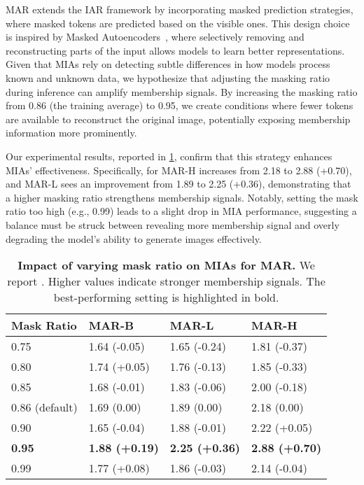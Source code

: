 MAR extends the IAR framework by incorporating masked prediction strategies, where masked tokens are predicted based on the visible ones. This design choice is inspired by Masked Autoencoders~\citep{he2022masked}, where selectively removing and reconstructing parts of the input allows models to learn better representations. Given that MIAs rely on detecting subtle differences in how models process known and unknown data, we hypothesize that adjusting the masking ratio during inference can amplify membership signals. By increasing the masking ratio from 0.86 (the training average) to 0.95, we create conditions where fewer tokens are available to reconstruct the original image, potentially exposing membership information more prominently.  

Our experimental results, reported in \cref{tab:adjusting_mask}, confirm that this strategy enhances MIAs' effectiveness. Specifically, \tprat for MAR-H increases from 2.18 to 2.88 (+0.70), and MAR-L sees an improvement from 1.89 to 2.25 (+0.36), demonstrating that a higher masking ratio strengthens membership signals. Notably, setting the mask ratio too high (e.g., 0.99) leads to a slight drop in  MIA performance, suggesting a balance must be struck between revealing more membership signal and overly degrading the model’s ability to generate images effectively.

\begin{table}[h!]
    \centering
    \scriptsize
    \caption{\textbf{Impact of varying mask ratio on MIAs for MAR.} We report \tprat. Higher values indicate stronger membership signals. The best-performing setting is highlighted in bold.}
    \label{tab:adjusting_mask}
    \begin{tabular}{llll}
\toprule
Mask Ratio & MAR-B & MAR-L & MAR-H \\
\midrule
0.75 & 1.64 (-0.05) & 1.65 (-0.24) & 1.81 (-0.37) \\
0.80 & 1.74 (+0.05) & 1.76 (-0.13) & 1.85 (-0.33) \\
0.85 & 1.68 (-0.01) & 1.83 (-0.06) & 2.00 (-0.18) \\
0.86  (default) & 1.69 (0.00) & 1.89 (0.00) & 2.18 (0.00) \\
0.90 & 1.65 (-0.04) & 1.88 (-0.01) & 2.22 (+0.05) \\
\textbf{0.95} & \textbf{1.88 (+0.19)} & \textbf{2.25 (+0.36)} & \textbf{2.88 (+0.70)} \\
0.99 & 1.77 (+0.08) & 1.86 (-0.03) & 2.14 (-0.04) \\

\bottomrule
\end{tabular}
\end{table}



